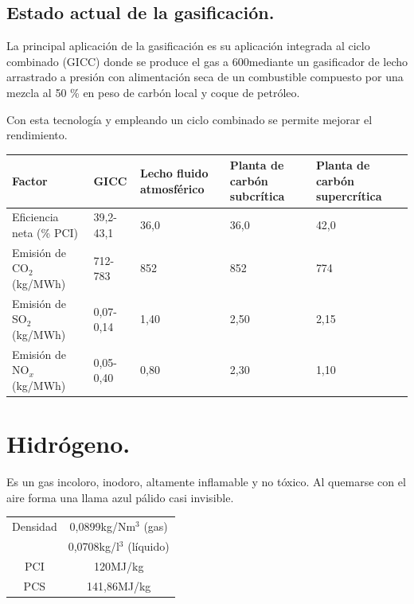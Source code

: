 \subsection{Estado actual de la gasificación.}
La principal aplicación de la gasificación es su aplicación integrada al ciclo combinado (GICC) donde se produce el gas a 600\grado mediante un
gasificador de lecho arrastrado a presión con alimentación seca de un combustible compuesto por una mezcla al 50 \% en peso de carbón local y coque de petróleo.

Con esta tecnología y empleando un ciclo combinado se permite mejorar el rendimiento.
\begin{table}[H]
	\centering
	\begin{tabular}{p{4cm}p{1.5cm}p{2cm}p{2cm}p{2cm}}
		\toprule
		Factor&GICC&Lecho fluido atmosférico&Planta de carbón subcrítica&Planta de carbón supercrítica\\
		\midrule
	Eficiencia neta (\% PCI)	&39,2-43,1&36,0&36,0&42,0\\
	Emisión de CO$_2$ (kg/MWh)	&712-783  &852 &852 &774\\
	Emisión de SO$_2$ (kg/MWh)	&0,07-0,14&1,40&2,50&2,15\\
	Emisión de NO$_x$ (kg/MWh)	&0,05-0,40&0,80&2,30&1,10\\
		\bottomrule
	\end{tabular}
	\label{tab:4x25_table}
\end{table}

\section{Hidrógeno.}
Es un gas incoloro, inodoro, altamente inflamable y no tóxico. Al quemarse con el aire forma una llama azul pálido casi invisible.
\begin{table}[H]
	\centering
	
	\begin{tabular}{cc}
		\toprule
		Densidad&0,0899kg/Nm$^3$ (gas)\\
		&0,0708kg/l$^3$ (líquido)\\
		\midrule
		PCI&120MJ/kg\\
		PCS&141,86MJ/kg\\
		\bottomrule
	\end{tabular}
	\label{tab:4x225_table}
\end{table}
